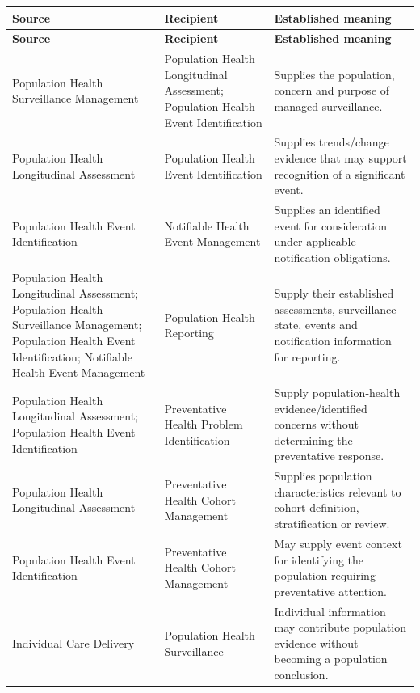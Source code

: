 \label{rad:business:1257}
\begingroup\small\setlength{\TableWidth}{\dimexpr\linewidth-6\tabcolsep-4\arrayrulewidth\relax}
\begin{longtable}{|>{\raggedright\arraybackslash}p{0.24\TableWidth}|>{\raggedright\arraybackslash}p{0.33\TableWidth}|>{\raggedright\arraybackslash}p{0.43\TableWidth}|}
\hline\rowcolor{TableHead}\textbf{Source} & \textbf{Recipient} & \textbf{Established meaning}\\\hline\endfirsthead
\hline\rowcolor{TableHead}\textbf{Source} & \textbf{Recipient} & \textbf{Established meaning}\\\hline\endhead
\hline\endfoot
Population Health Surveillance Management & Population Health Longitudinal Assessment; Population Health Event Identification & Supplies the population, concern and purpose of managed surveillance.\\\hline
Population Health Longitudinal Assessment & Population Health Event Identification & Supplies trends/\allowbreak{}change evidence that may support recognition of a significant event.\\\hline
Population Health Event Identification & Notifiable Health Event Management & Supplies an identified event for consideration under applicable notification obligations.\\\hline
Population Health Longitudinal Assessment; Population Health Surveillance Management; Population Health Event Identification; Notifiable Health Event Management & Population Health Reporting & Supply their established assessments, surveillance state, events and notification information for reporting.\\\hline
Population Health Longitudinal Assessment; Population Health Event Identification & Preventative Health Problem Identification & Supply population-health evidence/\allowbreak{}identified concerns without determining the preventative response.\\\hline
Population Health Longitudinal Assessment & Preventative Health Cohort Management & Supplies population characteristics relevant to cohort definition, stratification or review.\\\hline
Population Health Event Identification & Preventative Health Cohort Management & May supply event context for identifying the population requiring preventative attention.\\\hline
Individual Care Delivery & Population Health Surveillance & Individual information may contribute population evidence without becoming a population conclusion.\\\hline

\end{longtable}
